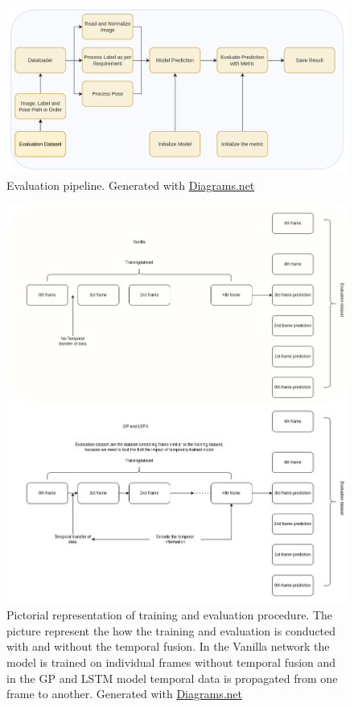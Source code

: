 	\begin{figure}
		\centering
		\includegraphics[width=14cm]{images/evaluation.png}
		\caption{Evaluation pipeline. Generated with \href{https://app.diagrams.net/}{Diagrams.net}}
		\label{fig:unet_evaluation}
	\end{figure}

	\begin{figure}
		\centering
		\includegraphics[width=14cm]{images/training_and_evaluation.png}
		\caption{Pictorial representation of training and evaluation procedure. The picture represent the how the training and evaluation is conducted with and without the temporal fusion. In the Vanilla network the model is trained on individual frames without temporal fusion and in the GP and LSTM model temporal data is propagated from one frame to another. Generated with \href{https://app.diagrams.net/}{Diagrams.net}}
		\label{fig:unet_evaluation}
	\end{figure}

